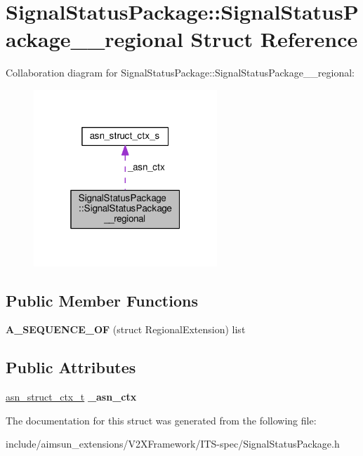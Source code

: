 \hypertarget{structSignalStatusPackage_1_1SignalStatusPackage____regional}{}\section{Signal\+Status\+Package\+:\+:Signal\+Status\+Package\+\_\+\+\_\+regional Struct Reference}
\label{structSignalStatusPackage_1_1SignalStatusPackage____regional}


Collaboration diagram for Signal\+Status\+Package\+:\+:Signal\+Status\+Package\+\_\+\+\_\+regional\+:\nopagebreak
\begin{figure}[H]
\begin{center}
\leavevmode
\includegraphics[width=196pt]{structSignalStatusPackage_1_1SignalStatusPackage____regional__coll__graph}
\end{center}
\end{figure}
\subsection*{Public Member Functions}
\begin{DoxyCompactItemize}
\item 
{\bfseries A\+\_\+\+S\+E\+Q\+U\+E\+N\+C\+E\+\_\+\+OF} (struct Regional\+Extension) list\hypertarget{structSignalStatusPackage_1_1SignalStatusPackage____regional_ab4eec94fa100bbb02acf0a17e80354da}{}\label{structSignalStatusPackage_1_1SignalStatusPackage____regional_ab4eec94fa100bbb02acf0a17e80354da}

\end{DoxyCompactItemize}
\subsection*{Public Attributes}
\begin{DoxyCompactItemize}
\item 
\hyperlink{structasn__struct__ctx__s}{asn\+\_\+struct\+\_\+ctx\+\_\+t} {\bfseries \+\_\+asn\+\_\+ctx}\hypertarget{structSignalStatusPackage_1_1SignalStatusPackage____regional_a89c26ca118fc46944f00c0eb50213d93}{}\label{structSignalStatusPackage_1_1SignalStatusPackage____regional_a89c26ca118fc46944f00c0eb50213d93}

\end{DoxyCompactItemize}


The documentation for this struct was generated from the following file\+:\begin{DoxyCompactItemize}
\item 
include/aimsun\+\_\+extensions/\+V2\+X\+Framework/\+I\+T\+S-\/spec/Signal\+Status\+Package.\+h\end{DoxyCompactItemize}
